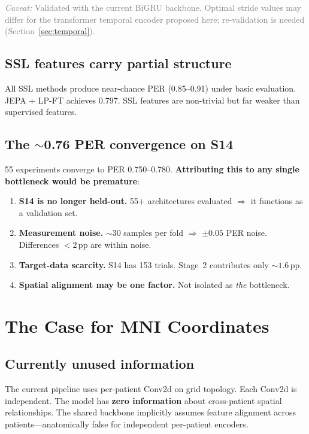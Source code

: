 \documentclass[11pt,letterpaper]{article}
\newcommand{\caveat}[1]{\par\smallskip\noindent\textcolor{gray}{\textit{Caveat:} #1}\smallskip}
\newcommand{\pp}{\,\text{pp}}
\begin{document}
\caveat{Validated with the current BiGRU backbone. Optimal stride values may differ for the transformer temporal encoder proposed here; re-validation is needed (Section~\ref{sec:temporal}).}

\subsection{SSL features carry partial structure}

All SSL methods produce near-chance PER (0.85--0.91) under basic evaluation. JEPA + LP-FT achieves 0.797. SSL features are non-trivial but far weaker than supervised features.

\subsection{The ${\sim}$0.76 PER convergence on S14}\label{sec:wall}

55 experiments converge to PER 0.750--0.780. \textbf{Attributing this to any single bottleneck would be premature}:
\begin{enumerate}[leftmargin=2em]
\item \textbf{S14 is no longer held-out.} 55+ architectures evaluated $\Rightarrow$ it functions as a validation set.
\item \textbf{Measurement noise.} ${\sim}30$ samples per fold $\Rightarrow$ ${\pm}0.05$ PER noise. Differences ${<}2\pp$ are within noise.
\item \textbf{Target-data scarcity.} S14 has 153 trials. Stage~2 contributes only ${\sim}1.6\pp$.
\item \textbf{Spatial alignment may be one factor.} Not isolated as \emph{the} bottleneck.
\end{enumerate}


\section{The Case for MNI Coordinates}

\subsection{Currently unused information}

The current pipeline uses per-patient Conv2d on grid topology. Each Conv2d is independent. The model has \textbf{zero information} about cross-patient spatial relationships. The shared backbone implicitly assumes feature alignment across patients---anatomically false for independent per-patient encoders.
\end{document}
